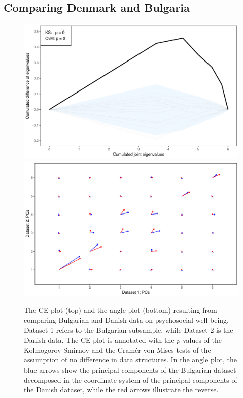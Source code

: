 \documentclass[titlepage,11pt,twoside]{article}
\begin{document}
{\subsection{Comparing Denmark and Bulgaria}
\begin{figure}
\center
\includegraphics[scale = 0.7]{essDKBGce.pdf}
\includegraphics[scale = 0.7]{essDKBGhair.pdf}
\caption{The CE plot (top) and the angle plot (bottom) resulting from comparing Bulgarian and Danish data on psychosocial well-being. Dataset 1 refers to the Bulgarian subsample, while Dataset 2 is the Danish data. The CE plot is annotated with the $p$-values of the Kolmogorov-Smirnov and the Cram\'er-von Mises tests of the assumption of no difference in data structures. In the angle plot, the blue arrows show the principal components of the Bulgarian dataset decomposed in the coordinate system of the principal components of the Danish dataset, while the red arrows illustrate the reverse.}
\label{plotBG.cehair}
\end{figure}

}
\end{document}
